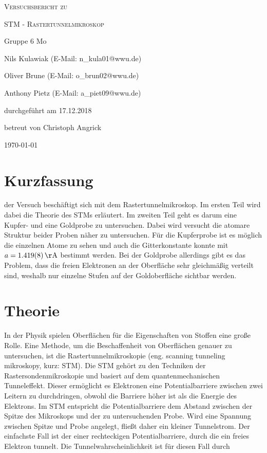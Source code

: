 \documentclass[
	a4paper,
	12pt,
	pagesize,
	ngerman
]{scrartcl}
\begin{document}
\begin{titlepage}
	\centering
	{\scshape\LARGE Versuchsbericht zu \par}
	\vspace{1cm}
	{\scshape\huge STM - Rastertunnelmikroskop \par}
	\vspace{2.5cm}
	{\LARGE Gruppe 6 Mo\par}
	\vspace{0.5cm}
	{\large Nils Kulawiak (E-Mail: n\_kula01@wwu.de) \par}
	{\large Oliver Brune (E-Mail: o\_brun02@wwu.de) \par}
	{\large Anthony Pietz (E-Mail: a\_piet09@wwu.de) \par}
	\vfill
	durchgeführt am 17.12.2018\par
	
	\vfill
	betreut von Christoph Angrick
	{\large \today\par}
\end{titlepage}

\tableofcontents
		
\newpage
\section{Kurzfassung}
der Versuch beschäftigt sich mit dem Rastertunnelmikroskop. Im ersten Teil wird dabei die Theorie des STMs erläutert. Im zweiten Teil geht es darum eine Kupfer- und eine Goldprobe zu untersuchen. Dabei wird versucht die atomare Struktur beider Proben näher zu untersuchen. Für die Kupferprobe ist es möglich die einzelnen Atome zu sehen und auch die Gitterkonstante konnte mit $a = \SI{1,419 \pm 0,008} {\AA}$ bestimmt werden. Bei der Goldprobe allerdings gibt es das Problem, dass die freien Elektronen an der Oberfläche sehr gleichmäßig verteilt sind, weshalb nur einzelne Stufen auf der Goldoberfläche sichtbar werden. 

\section{Theorie}
In der Physik spielen Oberflächen für die Eigenschaften von Stoffen eine große Rolle. Eine Methode, um die Beschaffenheit von Oberflächen genauer zu untersuchen, ist die Rastertunnelmikroskopie (eng. scanning tunneling mikroskopy, kurz: STM). Die STM gehört zu den Techniken der Rastersondenmikroskopie und basiert auf dem  quantenmechanischen Tunneleffekt. Dieser ermöglicht es Elektronen eine Potentialbarriere zwischen zwei Leitern zu durchdringen, obwohl die Barriere höher ist als die Energie des Elektrons. Im STM entspricht die Potentialbarriere dem Abstand zwischen der Spitze des Mikroskops und der zu untersuchenden Probe. Wird eine Spannung zwischen Spitze und Probe angelegt, fließt daher ein kleiner Tunnelstrom. Der einfachste Fall ist der einer rechteckigen Potentialbarriere, durch die ein freies Elektron tunnelt. Die Tunnelwahrscheinlichkeit ist für diesen Fall durch
\end{document}
